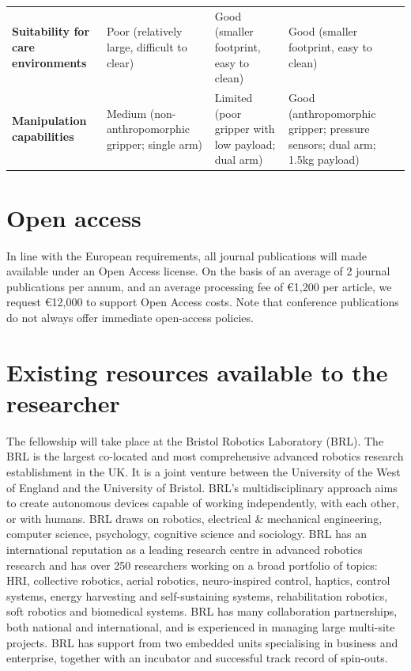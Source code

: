 \documentclass[11pt,a4paper]{report}
\begin{document}
\begin{table}[]
\begin{tabular}{@{}p{3cm}p{5cm}p{5cm}p{5cm}@{}}
\textbf{Suitability for care environments} & Poor (relatively large, difficult to clear)              & Good (smaller footprint, easy to clean)                                   & Good (smaller footprint, easy to clean)                                                                                                      \\
\textbf{Manipulation capabilities}         & Medium (non-anthropomorphic gripper; single arm)         & Limited (poor gripper with low payload; dual arm)                         & Good (anthropomorphic gripper; pressure sensors; dual arm; 1.5kg payload)                                                                    \\ \bottomrule
\end{tabular}
    \label{robot-comparison}
\end{table}

\section{Open access}

In line with the European requirements, all journal publications will made
available under an Open Access license. On the basis of an average of 2 journal
publications per annum, and an average processing fee of €1,200 per article, we
request €12,000 to support Open Access costs. Note that conference publications
do not always offer immediate open-access policies.

\section{Existing resources available to the researcher}

The fellowship will take place at the Bristol Robotics Laboratory (BRL).  The
BRL is the largest co-located and most comprehensive advanced robotics research
establishment in the UK. It is a joint venture between the University of the
West of England and the University of Bristol. BRL's multidisciplinary approach
aims to create autonomous devices capable of working independently, with each
other, or with humans. BRL draws on robotics, electrical \& mechanical
engineering, computer science, psychology, cognitive science and sociology. BRL
has an international reputation as a leading research centre in advanced
robotics research and has over 250 researchers working on a broad portfolio of
topics: HRI, collective robotics, aerial robotics, neuro-inspired control,
haptics, control systems, energy harvesting and self-sustaining systems,
rehabilitation robotics, soft robotics and biomedical systems. BRL has many
collaboration partnerships, both national and international, and is experienced
in managing large multi-site projects. BRL has support from two embedded units
specialising in business and enterprise, together with an incubator and
successful track record of spin-outs.
\end{document}
